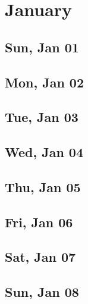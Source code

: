 \chapter{January}
	\section{Sun, Jan 01}
		
		
	\section{Mon, Jan 02}
		
		
	\section{Tue, Jan 03}
		
		
	\section{Wed, Jan 04}
		
		
	\section{Thu, Jan 05}
		
		
	\section{Fri, Jan 06}
		
		
	\section{Sat, Jan 07}
		
		
	\section{Sun, Jan 08}
		
		
